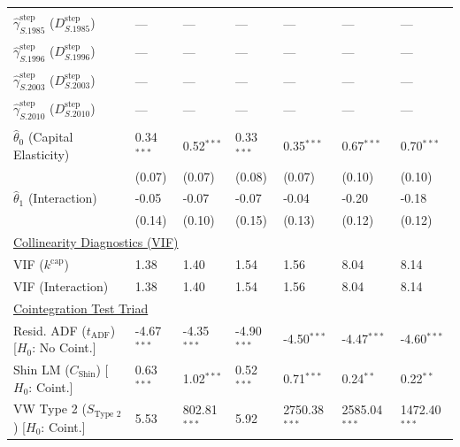 \begin{table}[H]
\begin{tabular}{p{3.8cm}p{1.35cm}p{1.35cm}p{1.35cm}p{1.35cm}p{1.35cm}p{1.35cm}}
 &  &  &  &  &  &   \\
$\hat{\gamma}^{\text{step}}_{S.1985}$ ($D^{\text{step}}_{S.1985}$)  & --- & --- & --- & --- & --- & ---  \\
 &  &  &  &  &  &   \\
$\hat{\gamma}^{\text{step}}_{S.1996}$ ($D^{\text{step}}_{S.1996}$)  & --- & --- & --- & --- & --- & ---  \\
 &  &  &  &  &  &   \\
$\hat{\gamma}^{\text{step}}_{S.2003}$ ($D^{\text{step}}_{S.2003}$)  & --- & --- & --- & --- & --- & ---  \\
 &  &  &  &  &  &   \\
$\hat{\gamma}^{\text{step}}_{S.2010}$ ($D^{\text{step}}_{S.2010}$)  & --- & --- & --- & --- & --- & ---  \\
 &  &  &  &  &  &   \\
[1ex]
$\hat{\theta}_0$ (Capital Elasticity)  & 0.34$^{***}$ & 0.52$^{***}$ & 0.33$^{***}$ & 0.35$^{***}$ & 0.67$^{***}$ & 0.70$^{***}$  \\
 & {\scriptsize (0.07)} & {\scriptsize (0.07)} & {\scriptsize (0.08)} & {\scriptsize (0.07)} & {\scriptsize (0.10)} & {\scriptsize (0.10)}  \\
$\hat{\theta}_1$ (Interaction)  & -0.05 & -0.07 & -0.07 & -0.04 & -0.20 & -0.18  \\
 & {\scriptsize (0.14)} & {\scriptsize (0.10)} & {\scriptsize (0.15)} & {\scriptsize (0.13)} & {\scriptsize (0.12)} & {\scriptsize (0.12)}  \\
\midrule
\multicolumn{7}{l}{\underline{Collinearity Diagnostics (VIF)}} \\
VIF ($k^{\text{cap}}$) & 1.38 & 1.40 & 1.54 & 1.56 & 8.04 & 8.14  \\
VIF (Interaction) & 1.38 & 1.40 & 1.54 & 1.56 & 8.04 & 8.14  \\
\midrule
\multicolumn{7}{l}{\underline{Cointegration Test Triad}} \\
\makecell[l]{Resid. ADF ($t_{\text{ADF}}$) \\ {\scriptsize [$H_0$: No Coint.]}} & -4.67$^{***}$ & -4.35$^{***}$ & -4.90$^{***}$ & -4.50$^{***}$ & -4.47$^{***}$ & -4.60$^{***}$  \\
\makecell[l]{Shin LM ($C_{\text{Shin}}$) \\ {\scriptsize [$H_0$: Coint.]}} & 0.63$^{***}$ & 1.02$^{***}$ & 0.52$^{***}$ & 0.71$^{***}$ & 0.24$^{**}$ & 0.22$^{**}$  \\
\makecell[l]{VW Type 2 ($S_{\text{Type 2}}$) \\ {\scriptsize [$H_0$: Coint.]}} & 5.53 & 802.81$^{***}$ & 5.92 & 2750.38$^{***}$ & 2585.04$^{***}$ & 1472.40$^{***}$  \\

\end{tabular}
\end{table}
